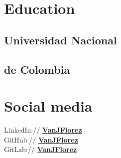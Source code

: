 \documentclass[]{CV-JuanCamiloFlorez}
\begin{document}
%
%
\lastupdated

%
%

%
%
\begin{minipage}[t]{0.33\textwidth} 

\section{Education} 
\subsection{Universidad Nacional}
\subsection{de Colombia}
\sectionsep

\section{Social media}
    LinkedIn:// \href{https://www.linkedin.com/in/vanjflores/}{\bf VanJFlorez} \\
    GitHub:// \href{https://github.com/jcammmmm}{\bf VanJFlorez} \\
    GitLab:// \href{https://gitlab.com/VanJFlorez}{\bf VanJFlorez} \\
\sectionsep


\end{minipage}
\end{document}
